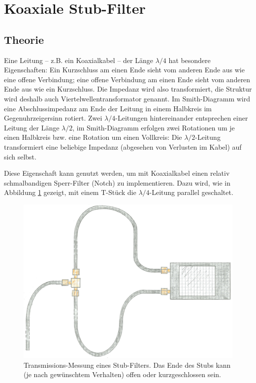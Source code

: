 \documentclass[twoside,a4paper,11pt,halfparskip,DIV=11,notitlepage]{scrartcl}
\begin{document}
\section{Koaxiale Stub-Filter}\label{sec:stubfilter}
\subsection{Theorie}
Eine Leitung -- z.B. ein Koaxialkabel -- der Länge $\lambda/4$ hat besondere
Eigenschaften: Ein Kurzschluss am einen Ende sieht vom anderen Ende aus wie
eine offene Verbindung; eine offene Verbindung am einen Ende sieht vom anderen
Ende aus wie ein Kurzschluss. Die Impedanz wird also transformiert, die
Struktur wird deshalb auch Viertelwellentransformator genannt. Im Smith-Diagramm
wird eine Abschlussimpedanz am Ende der Leitung in einem Halbkreis im Gegenuhrzeigersinn
rotiert. Zwei $\lambda/4$-Leitungen hintereinander entsprechen einer Leitung
der Länge $\lambda/2$, im Smith-Diagramm erfolgen zwei Rotationen um je einen
Halbkreis bzw. eine Rotation um einen Vollkreis: Die $\lambda/2$-Leitung
transformiert eine beliebige Impedanz (abgesehen von Verlusten im Kabel) auf
sich selbst.

Diese Eigenschaft kann genutzt werden, um mit Koaxialkabel einen relativ
schmalbandigen Sperr-Filter (Notch) zu implementieren. Dazu wird, wie in Abbildung
\ref{fig:quarterwavestub} gezeigt, mit einem T-Stück die $\lambda/4$-Leitung
parallel geschaltet. 

\begin{figure}[H]
    \includegraphics[width=\textwidth]{figures/illustration_stub.jpg}
    \caption{Transmissions-Messung eines Stub-Filters. Das Ende des Stubs kann
    (je nach gewünschtem Verhalten) offen oder kurzgeschlossen sein.}
    \label{fig:quarterwavestub}
\end{figure}
\end{document}
